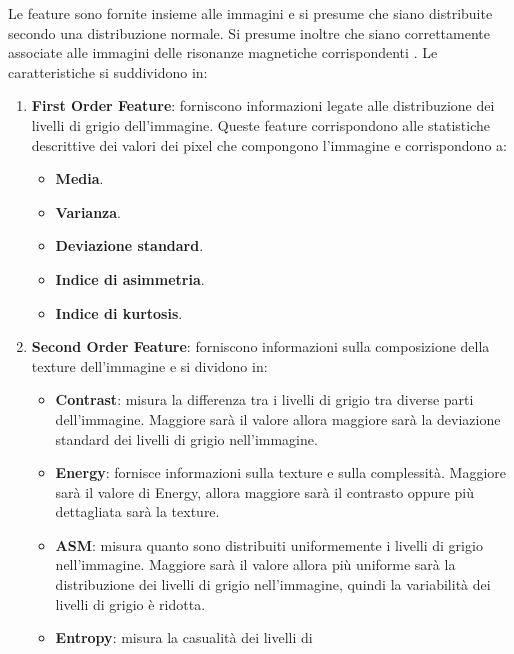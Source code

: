 Le feature sono fornite insieme alle immagini e si presume che siano distribuite
secondo una distribuzione normale. Si presume inoltre che siano correttamente
associate alle immagini delle risonanze magnetiche corrispondenti \cite{explanation-feature}.
Le caratteristiche si suddividono in:
\begin{enumerate}
      \item \textbf{First Order Feature}: forniscono informazioni legate alle
            distribuzione dei livelli di grigio dell'immagine. Queste feature
            corrispondono alle statistiche descrittive dei valori dei pixel
            che compongono l'immagine e corrispondono a:
            \begin{itemize}
                  \item \textbf{Media}.
                  \item \textbf{Varianza}.
                  \item \textbf{Deviazione standard}.
                  \item \textbf{Indice di asimmetria}.
                  \item \textbf{Indice di kurtosis}.
            \end{itemize}
      \item \textbf{Second Order Feature}: forniscono informazioni sulla
            composizione della texture dell'immagine e si dividono in:
            \begin{itemize}
                  \item \textbf{Contrast}: misura la differenza tra i livelli di
                        grigio tra diverse parti dell'immagine. Maggiore sarà il
                        valore allora maggiore sarà la deviazione standard dei
                        livelli di grigio nell'immagine.
                  \item \textbf{Energy}: fornisce informazioni sulla texture e
                        sulla complessità. Maggiore sarà il valore di Energy,
                        allora maggiore sarà il contrasto oppure più dettagliata
                        sarà la texture.
                  \item \textbf{ASM}: misura quanto sono distribuiti uniformemente
                        i livelli di grigio nell'immagine. Maggiore sarà il valore
                        allora più uniforme sarà la distribuzione dei livelli di
                        grigio nell'immagine, quindi la variabilità dei livelli
                        di grigio è ridotta.
                  \item \textbf{Entropy}: misura la casualità dei livelli di

\end{itemize}
\end{enumerate}

